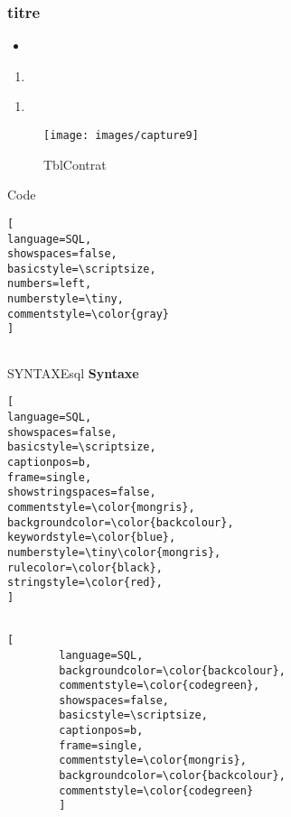 
\begin{frame}[containsverbatim]
\frametitle{titre}


\end{frame}

\begin{itemize}
	\item  
\end{itemize}

\begin{enumerate}[label=\arabic*)]
	\item 
\end{enumerate}

\begin{enumerate}[label=\Alph*)]
	\item 
\end{enumerate}

\begin{figure}[!h]
	\centering
	\texttt{[image: images/capture9]}
	\caption{TblContrat}
	\label{rand}
\end{figure}

Code

\begin{lstlisting}[
language=SQL,
showspaces=false,
basicstyle=\scriptsize,
numbers=left,
numberstyle=\tiny,
commentstyle=\color{gray}
]


\end{lstlisting}

SYNTAXEsql
\textbf{Syntaxe}
\begin{lstlisting}[
language=SQL,
showspaces=false,
basicstyle=\scriptsize,
captionpos=b, 
frame=single,	  
showstringspaces=false,
commentstyle=\color{mongris},
backgroundcolor=\color{backcolour},
keywordstyle=\color{blue},   
numberstyle=\tiny\color{mongris}, 
rulecolor=\color{black}, 
stringstyle=\color{red},
]


\end{lstlisting}

\begin{center}
	\begin{minipage}{8cm}
		\begin{lstlisting}[
		language=SQL,
		backgroundcolor=\color{backcolour},
		commentstyle=\color{codegreen},   
		showspaces=false,
		basicstyle=\scriptsize,
		captionpos=b, 
		frame=single,	  
		commentstyle=\color{mongris},
		backgroundcolor=\color{backcolour},
		commentstyle=\color{codegreen}   
		]
		
		\end{lstlisting}
	\end{minipage}
\end{center}

{\color{blue}}